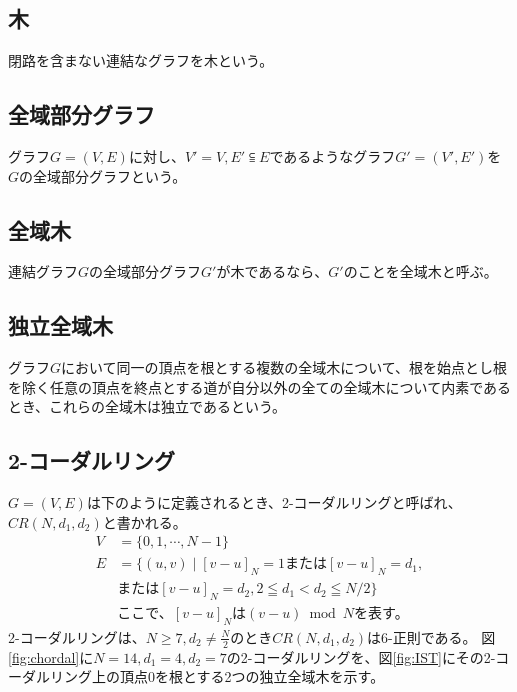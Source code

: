 \documentclass[twocolumn, 11pt]{jsarticle}
\begin{document}
    \subsection{木}
        閉路を含まない連結なグラフを木という\cite{2006離散数学入門}。
        
    \subsection{全域部分グラフ}
        グラフ$G=(V,E)$に対し、$V' = V, E' \subseteqq E$であるようなグラフ$G'=(V', E')$を$G$の全域部分グラフという。

    \subsection{全域木}
        連結グラフ$G$の全域部分グラフ$G'$が木であるなら、$G'$のことを全域木と呼ぶ\cite{2006離散数学入門}。

    \subsection{独立全域木}
        グラフ$G$において同一の頂点を根とする複数の全域木について、根を始点とし根を除く任意の頂点を終点とする道が自分以外の全ての全域木について内素であるとき、これらの全域木は独立であるという\cite{chartrand1993applied}。

    \subsection{2-コーダルリング}
        $G = (V, E)$は下のように定義されるとき、2-コーダルリングと呼ばれ、$CR(N, d_1, d_2)$と書かれる\cite{YukihiroHAMADA2016}。
        \begin{equation*}
            \begin{split}
                V &= \{0, 1, \cdots, N-1\} \\
                E &= \{(u, v) \mid [v-u]_N = 1 \text{または} [v-u]_N = d_1, \\
                  &\text{または} [v-u]_N = d_2, 2 \leqq d_1 < d_2 \leqq N/2\} \\
                  &\text{ここで、}[v-u]_N \text{は} (v-u) \bmod N \text{を表す。}
            \end{split}
        \end{equation*}
        2-コーダルリングは、$N\geq7, d_2\neq\frac{N}{2}$のとき$CR(N,d_1,d_2)$は6-正則である。
        図\ref{fig:chordal}に$N = 14, d_1 = 4, d_2 = 7$の2-コーダルリングを、図\ref{fig:IST}にその2-コーダルリング上の頂点0を根とする2つの独立全域木を示す。
        \newpage
      
\end{document}
